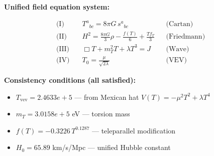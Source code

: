 
\textbf{Unified field equation system:}

\begin{align}
  \text{(I)} \quad & T^a{}_{bc} = 8\pi G \, s^a{}_{bc} && \text{(Cartan)} \\
  \text{(II)} \quad & H^2 = \frac{8\pi G}{3}\rho - \frac{f(T)}{6} + \frac{Tf_T}{3} && \text{(Friedmann)} \\
  \text{(III)} \quad & \Box T + m_T^2 T + \lambda T^3 = J && \text{(Wave)} \\
  \text{(IV)} \quad & T_0 = \frac{\mu}{\sqrt{2\lambda}} && \text{(VEV)}
\end{align}

\textbf{Consistency conditions (all satisfied):}
\begin{itemize}
  \item $T_{\text{vev}} = 2.4633e+5$ — from Mexican hat $V(T) = -\mu^2 T^2 + \lambda T^4$
  \item $m_T = 3.0158e+5$ eV — torsion mass
  \item $f(T) = -0.3226 \, T^{0.1287}$ — teleparallel modification
  \item $H_0 = 65.89$ km/s/Mpc — unified Hubble constant
\end{itemize}